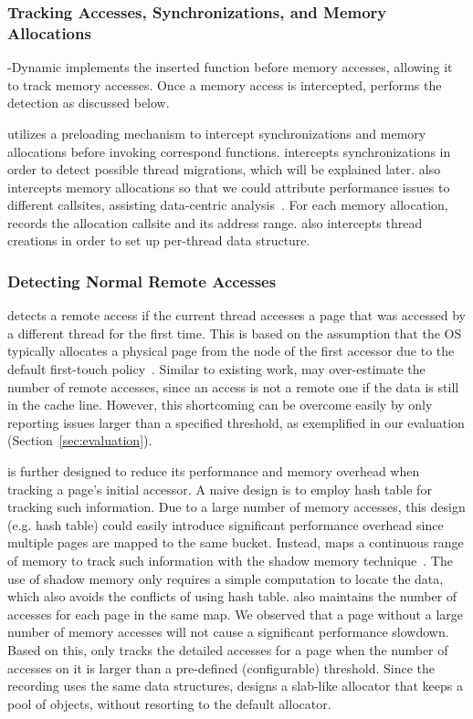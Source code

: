 \subsubsection{Tracking Accesses, Synchronizations, and Memory Allocations}

\NP{}-Dynamic implements the inserted function before memory accesses, allowing it to track memory accesses. Once a memory access is intercepted, \NP{} performs the detection as discussed below. 

\NP{} utilizes a preloading mechanism to intercept synchronizations and memory allocations before invoking correspond functions.
\NP{} intercepts synchronizations in order to detect possible thread migrations, which will be explained later. \NP{} also intercepts memory allocations so that we could attribute performance issues to different callsites, assisting data-centric analysis~\cite{XuNuma}. For each memory allocation, \NP{} records the allocation callsite and its address range. 
\NP{} also intercepts thread creations in order to set up per-thread data structure. 


\subsubsection{Detecting Normal Remote Accesses}
\label{sec: remote_access}


\NP{} detects a remote access if the current thread accesses a page that was accessed by a different thread for the first time. This is based on the assumption that the OS typically allocates a physical page from the node of the first accessor due to the default first-touch policy~\cite{firsttouch}.  Similar to existing work, \NP{} may over-estimate the number of remote accesses, since an access is not a remote one if the data is still in the cache line. 
However, this shortcoming can be overcome easily by only reporting issues larger than a specified threshold, as exemplified in our evaluation (Section~\ref{sec:evaluation}).  

\NP{} is further designed to reduce its performance and memory overhead when tracking a page's initial accessor. A naive design is to employ hash table for tracking such information. Due to a large number of memory accesses, this design (e.g. hash table) could easily introduce significant performance overhead since multiple pages are mapped to the same bucket. Instead, \NP{} maps a continuous range of memory to track such information with the shadow memory technique~\cite{qinzhao}. The use of shadow memory only requires a simple computation to locate the data, which also avoids the conflicts of using hash table. 
\NP{} also maintains the number of accesses for each page in the same map. We observed that a page without a large number of memory accesses will not cause a significant performance slowdown. Based on this, \NP{} only tracks the detailed accesses for a page when the number of accesses on it is larger than a pre-defined (configurable) threshold. 
Since the recording uses the same data structures, \NP{} designs a slab-like allocator that keeps a pool of objects, without resorting to the default allocator.  

